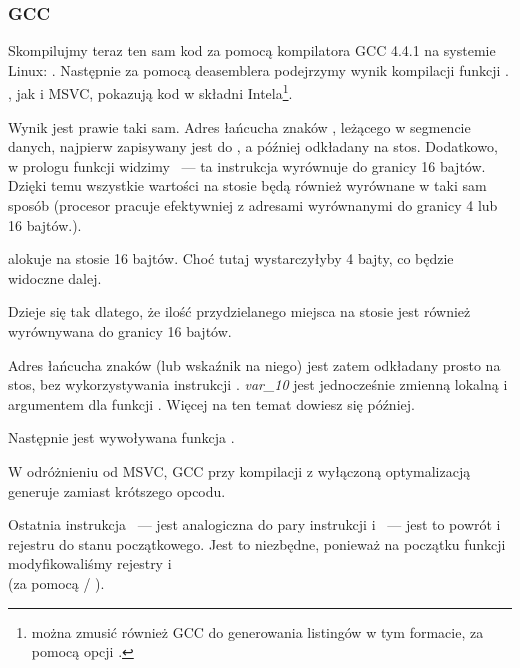 \subsubsection{GCC}

Skompilujmy teraz ten sam kod za pomocą kompilatora GCC 4.4.1 na systemie Linux: .
Następnie za pomocą deasemblera \IDA podejrzymy wynik kompilacji funkcji \main.
\IDA, jak i MSVC, pokazują kod w składni Intela\footnote{można zmusić również GCC do generowania listingów w tym formacie, za pomocą opcji .}.



Wynik jest prawie taki sam.
Adres łańcucha znaków , leżącego w segmencie danych, najpierw zapisywany jest do \EAX, a później odkładany na stos.
Dodatkowo, w prologu funkcji widzimy ~---
ta instrukcja wyrównuje \ESP do granicy 16 bajtów.
Dzięki temu wszystkie wartości na stosie będą również wyrównane w taki sam sposób (procesor pracuje efektywniej z adresami wyrównanymi do granicy 4 lub 16 bajtów.).

 alokuje na stosie 16 bajtów. Choć tutaj wystarczyłyby 4 bajty, co będzie widoczne dalej.

Dzieje się tak dlatego, że ilość przydzielanego miejsca na stosie jest również wyrównywana do granicy 16 bajtów.

Adres łańcucha znaków (lub wskaźnik na niego) jest zatem odkładany prosto na stos, bez wykorzystywania instrukcji \PUSH.
\emph{var\_10} jest jednocześnie zmienną lokalną i argumentem dla funkcji \printf{}.
Więcej na ten temat dowiesz się później.

Następnie jest wywoływana funkcja \printf.

W odróżnieniu od MSVC, GCC przy kompilacji z wyłączoną optymalizacją generuje  zamiast krótszego opcodu.

Ostatnia instrukcja \LEAVE~--- jest analogiczna do pary instrukcji   i ~--- jest to powrót  i rejestru \EBP do stanu początkowego.
Jest to niezbędne, ponieważ na początku funkcji modyfikowaliśmy rejestry \ESP i \EBP\\
(za pomocą  / ).

